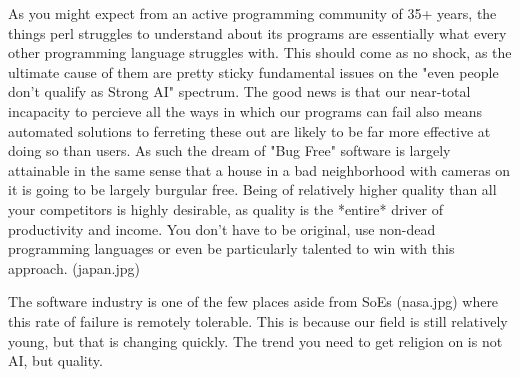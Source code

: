 \documentclass{article}
\begin{document}
As you might expect from an active programming community of 35+ years, the things perl struggles to understand about its programs are essentially what every other programming language struggles with.
This should come as no shock, as the ultimate cause of them are pretty sticky fundamental issues on the "even people don't qualify as Strong AI" spectrum.
The good news is that our near-total incapacity to percieve all the ways in which our programs can fail also means automated solutions to ferreting these out are likely to be far more effective at doing so than users.
As such the dream of "Bug Free" software is largely attainable in the same sense that a house in a bad neighborhood with cameras on it is going to be largely burgular free.
Being of relatively higher quality than all your competitors is highly desirable, as quality is the *entire* driver of productivity and income.
You don't have to be original, use non-dead programming languages or even be particularly talented to win with this approach. (japan.jpg)

The software industry is one of the few places aside from SoEs (nasa.jpg) where this rate of failure is remotely tolerable.
This is because our field is still relatively young, but that is changing quickly.
The trend you need to get religion on is not AI, but quality.

\newpage


\end{document}
